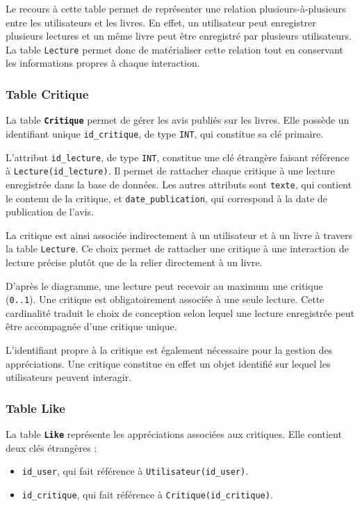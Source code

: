 \documentclass[
  letterpaper,
  DIV=11,
  numbers=noendperiod]{scrartcl}
\providecommand{\tightlist}{%
  \setlength{\itemsep}{0pt}\setlength{\parskip}{0pt}}
\begin{document}
Le recours à cette table permet de représenter une relation
plusieurs-à-plusieurs entre les utilisateurs et les livres. En effet, un
utilisateur peut enregistrer plusieurs lectures et un même livre peut
être enregistré par plusieurs utilisateurs. La table \texttt{Lecture}
permet donc de matérialiser cette relation tout en conservant les
informations propres à chaque interaction.

\subsubsection{Table Critique}\label{table-critique}

La table \textbf{\texttt{Critique}} permet de gérer les avis publiés sur
les livres. Elle possède un identifiant unique \texttt{id\_critique}, de
type \texttt{INT}, qui constitue sa clé primaire.

L'attribut \texttt{id\_lecture}, de type \texttt{INT}, constitue une clé
étrangère faisant référence à \texttt{Lecture(id\_lecture)}. Il permet
de rattacher chaque critique à une lecture enregistrée dans la base de
données. Les autres attributs sont \texttt{texte}, qui contient le
contenu de la critique, et \texttt{date\_publication}, qui correspond à
la date de publication de l'avis.

La critique est ainsi associée indirectement à un utilisateur et à un
livre à travers la table \texttt{Lecture}. Ce choix permet de rattacher
une critique à une interaction de lecture précise plutôt que de la
relier directement à un livre.

D'après le diagramme, une lecture peut recevoir au maximum une critique
(\texttt{0..1}). Une critique est obligatoirement associée à une seule
lecture. Cette cardinalité traduit le choix de conception selon lequel
une lecture enregistrée peut être accompagnée d'une critique unique.

L'identifiant propre à la critique est également nécessaire pour la
gestion des appréciations. Une critique constitue en effet un objet
identifié sur lequel les utilisateurs peuvent interagir.

\subsubsection{Table Like}\label{table-like}

La table \textbf{\texttt{Like}} représente les appréciations associées
aux critiques. Elle contient deux clés étrangères :

\begin{itemize}
\tightlist
\item
  \texttt{id\_user}, qui fait référence à
  \texttt{Utilisateur(id\_user)}.
\item
  \texttt{id\_critique}, qui fait référence à
  \texttt{Critique(id\_critique)}.
\end{itemize}
\end{document}
